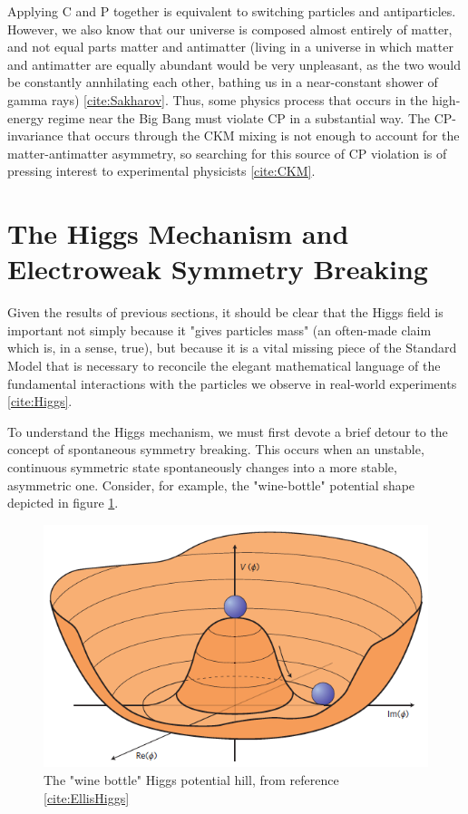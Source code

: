 Applying C and P together is equivalent to switching particles and antiparticles. However, we also know that our universe is composed almost entirely of matter, and not equal parts matter and antimatter (living in a universe in which matter and antimatter are equally abundant would be very unpleasant, as the two would be constantly annhilating each other, bathing us in a near-constant shower of gamma rays) \ref{cite:Sakharov}. Thus, some physics process that occurs in the high-energy regime near the Big Bang must violate CP in a substantial way. The CP-invariance that occurs through the CKM mixing is not enough to account for the matter-antimatter asymmetry, so searching for this source of CP violation is of pressing interest to experimental physicists \ref{cite:CKM}.

\section{The Higgs Mechanism and Electroweak Symmetry Breaking} \label{sec:EWSB} 

Given the results of previous sections, it should be clear that the Higgs field is important not simply because it "gives particles mass" (an often-made claim which is, in a sense, true), but because it is a vital missing piece of the Standard Model that is necessary to reconcile the elegant mathematical language of the fundamental interactions with the particles we observe in real-world experiments \ref{cite:Higgs}.

To understand the Higgs mechanism, we must first devote a brief detour to the concept of spontaneous symmetry breaking. This occurs when an unstable, continuous symmetric state spontaneously changes into a more stable, asymmetric one. Consider, for example, the "wine-bottle" potential shape depicted in figure \ref{fig:potential}.

\begin{figure}
\includegraphics[width=\linewidth]{figures/theory_chapter/higgspotential.png}
\caption{The "wine bottle" Higgs potential hill, from reference \ref{cite:EllisHiggs}}
\label{fig:potential}
\end{figure}

